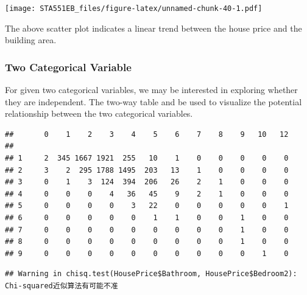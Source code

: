 \documentclass[
]{book}
\newenvironment{Shaded}{\begin{snugshade}}{\end{snugshade}}
\newcommand{\FunctionTok}[1]{\textcolor[rgb]{0.13,0.29,0.53}{\textbf{#1}}}
\newcommand{\NormalTok}[1]{#1}
\newcommand{\SpecialCharTok}[1]{\textcolor[rgb]{0.81,0.36,0.00}{\textbf{#1}}}
\begin{document}
\texttt{[image: STA551EB\_files/figure-latex/unnamed-chunk-40-1.pdf]}

The above scatter plot indicates a linear trend between the house price and the building area.

\hypertarget{two-categorical-variable}{%
\subsubsection{Two Categorical Variable}\label{two-categorical-variable}}

For given two categorical variables, we may be interested in exploring whether they are independent. The two-way table and be used to visualize the potential relationship between the two categorical variables.

\begin{Shaded}
\end{Shaded}

\begin{verbatim}
##       0    1    2    3    4    5    6    7    8    9   10   12
##                                                               
## 1     2  345 1667 1921  255   10    1    0    0    0    0    0
## 2     3    2  295 1788 1495  203   13    1    0    0    0    0
## 3     0    1    3  124  394  206   26    2    1    0    0    0
## 4     0    0    0    4   36   45    9    2    1    0    0    0
## 5     0    0    0    0    3   22    0    0    0    0    0    1
## 6     0    0    0    0    0    1    1    0    0    1    0    0
## 7     0    0    0    0    0    0    0    0    0    1    0    0
## 8     0    0    0    0    0    0    0    0    0    1    0    0
## 9     0    0    0    0    0    0    0    0    0    0    1    0
\end{verbatim}

\begin{Shaded}
\end{Shaded}

\begin{verbatim}
## Warning in chisq.test(HousePrice$Bathroom, HousePrice$Bedroom2): Chi-squared近似算法有可能不准
\end{verbatim}
\end{document}

